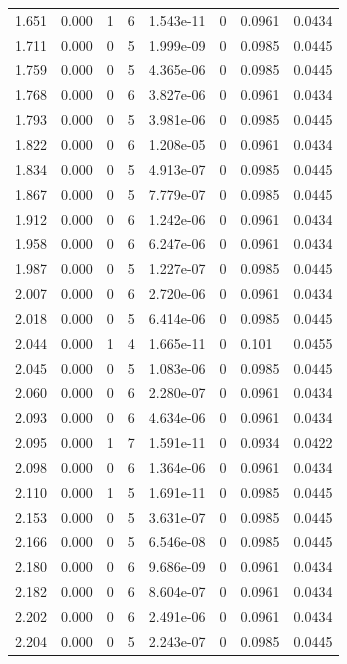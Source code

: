 \documentclass[preview]{standalone}
\begin{document}
{{{\begin{tabular}{L{1.2cm}C{1.2cm} C{0.3cm}C{0.5cm} C{1.4cm}C{1.4cm} C{1.4cm}C{1.4cm}}
  1.651  &  0.000  & 1     &  6 &  1.543e-11  & 0  & 0.0961 &  0.0434   \\ 
  1.711  &  0.000  & 0     &  5 &  1.999e-09  & 0  & 0.0985 &  0.0445   \\ 
  1.759  &  0.000  & 0     &  5 &  4.365e-06  & 0  & 0.0985 &  0.0445   \\ 
  1.768  &  0.000  & 0     &  6 &  3.827e-06  & 0  & 0.0961 &  0.0434   \\ 
  1.793  &  0.000  & 0     &  5 &  3.981e-06  & 0  & 0.0985 &  0.0445   \\ 
  1.822  &  0.000  & 0     &  6 &  1.208e-05  & 0  & 0.0961 &  0.0434   \\ 
  1.834  &  0.000  & 0     &  5 &  4.913e-07  & 0  & 0.0985 &  0.0445   \\ 
  1.867  &  0.000  & 0     &  5 &  7.779e-07  & 0  & 0.0985 &  0.0445   \\ 
  1.912  &  0.000  & 0     &  6 &  1.242e-06  & 0  & 0.0961 &  0.0434   \\ 
  1.958  &  0.000  & 0     &  6 &  6.247e-06  & 0  & 0.0961 &  0.0434   \\ 
  1.987  &  0.000  & 0     &  5 &  1.227e-07  & 0  & 0.0985 &  0.0445   \\ 
  2.007  &  0.000  & 0     &  6 &  2.720e-06  & 0  & 0.0961 &  0.0434   \\ 
  2.018  &  0.000  & 0     &  5 &  6.414e-06  & 0  & 0.0985 &  0.0445   \\ 
  2.044  &  0.000  & 1     &  4 &  1.665e-11  & 0  & 0.101 &  0.0455   \\ 
  2.045  &  0.000  & 0     &  5 &  1.083e-06  & 0  & 0.0985 &  0.0445   \\ 
  2.060  &  0.000  & 0     &  6 &  2.280e-07  & 0  & 0.0961 &  0.0434   \\ 
  2.093  &  0.000  & 0     &  6 &  4.634e-06  & 0  & 0.0961 &  0.0434   \\ 
  2.095  &  0.000  & 1     &  7 &  1.591e-11  & 0  & 0.0934 &  0.0422   \\ 
  2.098  &  0.000  & 0     &  6 &  1.364e-06  & 0  & 0.0961 &  0.0434   \\ 
  2.110  &  0.000  & 1     &  5 &  1.691e-11  & 0  & 0.0985 &  0.0445   \\ 
  2.153  &  0.000  & 0     &  5 &  3.631e-07  & 0  & 0.0985 &  0.0445   \\ 
  2.166  &  0.000  & 0     &  5 &  6.546e-08  & 0  & 0.0985 &  0.0445   \\ 
  2.180  &  0.000  & 0     &  6 &  9.686e-09  & 0  & 0.0961 &  0.0434   \\ 
  2.182  &  0.000  & 0     &  6 &  8.604e-07  & 0  & 0.0961 &  0.0434   \\ 
  2.202  &  0.000  & 0     &  6 &  2.491e-06  & 0  & 0.0961 &  0.0434   \\ 
  2.204  &  0.000  & 0     &  5 &  2.243e-07  & 0  & 0.0985 &  0.0445   \\ 
\hline 
\end{tabular} 

}}}
\end{document}
